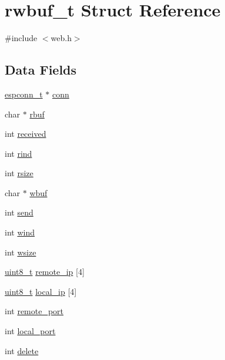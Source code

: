 \hypertarget{structrwbuf__t}{\section{rwbuf\-\_\-t Struct Reference}
\label{structrwbuf__t}
}


{\ttfamily \#include $<$web.\-h$>$}

\subsection*{Data Fields}
\begin{DoxyCompactItemize}
\item 
\hyperlink{web_8h_a6dae30cd245bde804cf3e2c09e39a4b6}{espconn\-\_\-t} $\ast$ \hyperlink{structrwbuf__t_a15785240e32c27f7af7c4b0cb1a6e39b}{conn}
\item 
char $\ast$ \hyperlink{structrwbuf__t_afd83372241273849c9395d587b146021}{rbuf}
\item 
int \hyperlink{structrwbuf__t_ac76412a0fbf9dc009ae3f8bb20660883}{received}
\item 
int \hyperlink{structrwbuf__t_ad5cbf7a78a5f5d9aa75b38f90e0fb6af}{rind}
\item 
int \hyperlink{structrwbuf__t_aa4094c7e329ae85cc50dbd06d3b50d44}{rsize}
\item 
char $\ast$ \hyperlink{structrwbuf__t_a68386231f3d907ec4508c090925782a2}{wbuf}
\item 
int \hyperlink{structrwbuf__t_a279490994b6576ad00900254a8c07a89}{send}
\item 
int \hyperlink{structrwbuf__t_a135345eee44e93f37e57dbabec12c339}{wind}
\item 
int \hyperlink{structrwbuf__t_ac723cf150dd35d0f67ba7d38b18863ad}{wsize}
\item 
\hyperlink{send_8c_aba7bc1797add20fe3efdf37ced1182c5}{uint8\-\_\-t} \hyperlink{structrwbuf__t_ad83926198e358ac1a569b0da7749572c}{remote\-\_\-ip} \mbox{[}4\mbox{]}
\item 
\hyperlink{send_8c_aba7bc1797add20fe3efdf37ced1182c5}{uint8\-\_\-t} \hyperlink{structrwbuf__t_aa26b4813db79aeaa293bb1eadfde0b54}{local\-\_\-ip} \mbox{[}4\mbox{]}
\item 
int \hyperlink{structrwbuf__t_aace1e79a985cc8fab4c2093208bf3763}{remote\-\_\-port}
\item 
int \hyperlink{structrwbuf__t_aac758cef289d022f4eb81d4c4fac7f04}{local\-\_\-port}
\item 
int \hyperlink{structrwbuf__t_a54e278f96a331cf0a61d22094c4b9f87}{delete}
\end{DoxyCompactItemize}


